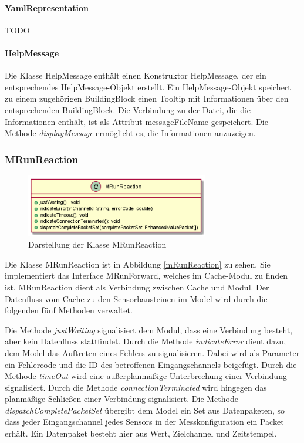 \documentclass[parskip=full]{scrartcl}
\begin{document}
\paragraph{YamlRepresentation}

TODO

\paragraph{HelpMessage}
Die Klasse HelpMessage enthält einen Konstruktor HelpMessage, der ein entsprechendes HelpMessage-Objekt erstellt.
Ein HelpMessage-Objekt speichert zu einem zugehörigen BuildingBlock einen Tooltip mit Informationen über den entsprechenden BuildingBlock. Die Verbindung zu der Datei, die die Informationen enthält, ist als Attribut messageFileName gespeichert. Die Methode
\textit{displayMessage} ermöglicht es, die Informationen anzuzeigen.



\subsubsection{MRunReaction}

\begin{figure}[htbp]
	\begin{center}
		\includegraphics[width = 8cm]{Grafiken/MRunReaction.png}
		\caption{Darstellung der Klasse MRunReaction}
		\label{MRunReaction}
	\end{center}
\end{figure}

Die Klasse MRunReaction ist in Abbildung \ref{mRunReaction} zu sehen. Sie implementiert das Interface MRunForward, welches im Cache-Modul zu finden ist. MRunReaction dient als Verbindung zwischen Cache und Modul. Der Datenfluss vom Cache zu den Sensorbausteinen im Model wird durch die folgenden fünf Methoden verwaltet.
 
Die Methode \textit{justWaiting} signalisiert dem Modul, dass eine Verbindung besteht, aber kein Datenfluss stattfindet. Durch die Methode \textit{indicateError} dient dazu, dem Model das Auftreten eines Fehlers zu signalisieren. Dabei wird als Parameter ein Fehlercode und die ID des betroffenen Eingangschannels beigefügt. 
Durch die Methode \textit{timeOut} wird eine außerplanmäßige Unterbrechung einer Verbindung signalisiert. Durch die Methode \textit{connectionTerminated} wird hingegen das planmäßige Schließen einer Verbindung signalisiert. 
Die Methode \textit{dispatchCompletePacketSet} übergibt dem Model ein Set aus Datenpaketen, so dass jeder Eingangschannel jedes Sensors in der Messkonfiguration ein Packet erhält. Ein Datenpaket besteht hier aus Wert, Zielchannel und Zeitstempel.
\end{document}
